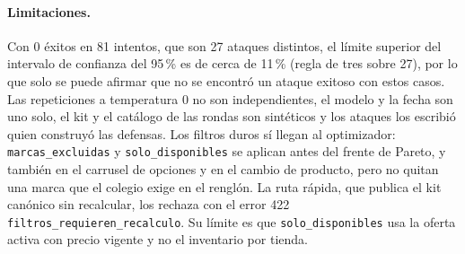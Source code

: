 \paragraph{Limitaciones.} Con 0 éxitos en 81 intentos, que son 27 ataques distintos, el límite superior del intervalo de confianza
del 95\,\% es de cerca de 11\,\% (regla de tres sobre 27), por lo que solo se puede afirmar que no se encontró
un ataque exitoso con estos casos. Las repeticiones a temperatura 0 no son independientes, el modelo
y la fecha son uno solo, el kit y el catálogo de las rondas son sintéticos y los ataques los escribió
quien construyó las defensas. Los filtros duros sí llegan al optimizador:
\texttt{marcas\_excluidas} y \texttt{solo\_disponibles} se aplican antes del frente de Pareto, y
también en el carrusel de opciones y en el cambio de producto, pero no quitan una marca que el
colegio exige en el renglón. La ruta rápida, que publica el kit canónico sin recalcular, los
rechaza con el error 422 \texttt{filtros\_requieren\_recalculo}. Su límite es que
\texttt{solo\_disponibles} usa la oferta activa con precio vigente y no el inventario por tienda.
